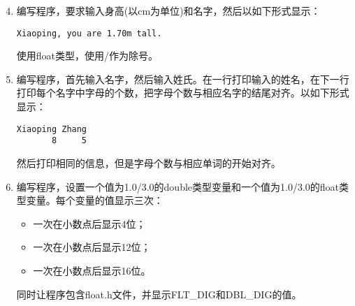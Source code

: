 \begin{frame}[fragile]
\begin{enumerate}\setcounter{enumi}{3} 
\item 编写程序，要求输入身高(以cm为单位)和名字，然后以如下形式显示：
\begin{lstlisting}[showspaces=true]
Xiaoping, you are 1.70m tall.
\end{lstlisting}
使用float类型，使用/作为除号。
\end{enumerate}
\end{frame}


\begin{frame}[fragile]
\begin{enumerate}\setcounter{enumi}{4} 
\item 编写程序，首先输入名字，然后输入姓氏。在一行打印输入的姓名，在下一行打印每个名字中字母的个数，把字母个数与相应名字的结尾对齐。以如下形式显示：
\begin{lstlisting}[showspaces=true]
Xiaoping Zhang
       8     5
\end{lstlisting}
然后打印相同的信息，但是字母个数与相应单词的开始对齐。
\end{enumerate}
\end{frame}


\begin{frame}[fragile]
\begin{enumerate}\setcounter{enumi}{5} 
\item 编写程序，设置一个值为1.0/3.0的double类型变量和一个值为1.0/3.0的float类型变量。每个变量的值显示三次：\\[0.05in]
\begin{itemize}
\item 一次在小数点后显示4位；\\[0.1in]
\item 一次在小数点后显示12位；\\[0.1in]
\item 一次在小数点后显示16位。\\[0.05in]
\end{itemize}
同时让程序包含float.h文件，并显示FLT\_DIG和DBL\_DIG的值。

\end{enumerate}
\end{frame}
